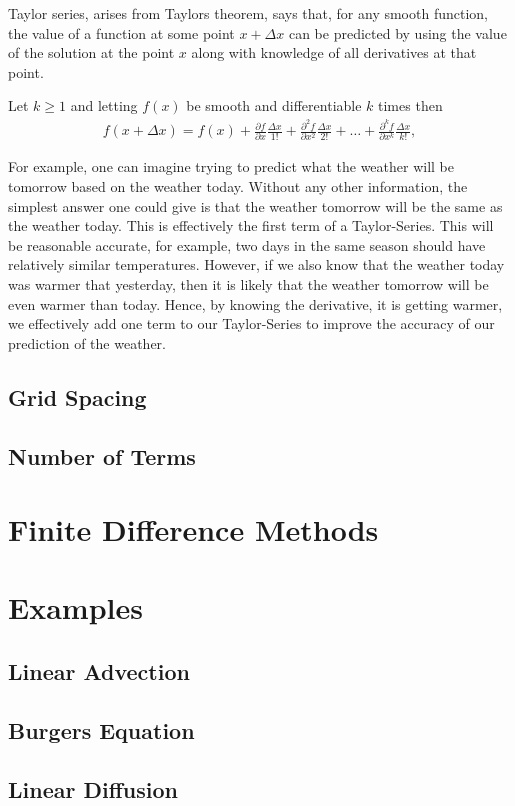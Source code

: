 Taylor series, arises from Taylors theorem, says that, for any smooth function, the value of a function at some point $x + \Delta x$ can be predicted by using the value of the solution at the point $x$ along with knowledge of all derivatives at that point.
\begin{theorem}
Let $k \geq 1$ and letting $f(x)$ be smooth and differentiable $k$ times then
\begin{align}
f(x + \Delta x) = f(x) + \frac{\partial f}{\partial x}\frac{\Delta x}{1!} + \frac{\partial^2 f}{\partial x^2}\frac{\Delta x}{2!} + \hdots + \frac{\partial^k f}{\partial x^k}\frac{\Delta x}{k!},
\end{align}
\end{theorem}
For example, one can imagine trying to predict what the weather will be tomorrow based on the weather today. Without any other information, the simplest answer one could give is that the weather tomorrow will be the same as the weather today. This is effectively the first term of a Taylor-Series. This will be reasonable accurate, for example, two days in the same season should have relatively similar temperatures. However, if we also know that the weather today was warmer that yesterday, then it is likely that the weather tomorrow will be even warmer than today. Hence, by knowing the derivative, it is getting warmer, we effectively add one term to our Taylor-Series to improve the accuracy of our prediction of the weather.
	
\section{Grid Spacing}

\section{Number of Terms}

\chapter{Finite Difference Methods}

\chapter{Examples}

\section{Linear Advection}

\section{Burgers Equation}

\section{Linear Diffusion}